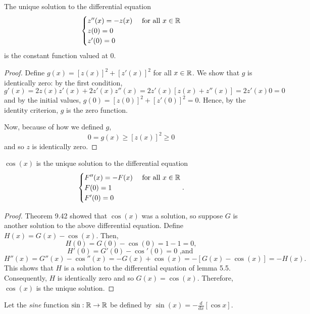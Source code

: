 \documentclass[letterpaper, twoside, 12pt]{book}
\begin{document}
\begin{lemma}[5.5]
  The unique solution to the differential equation
  \[
    \begin{cases}
      z''(x)=-z(x) & \text{ for all } x\in \mathbb R \\
      z(0)=0 \\
      z'(0)=0
    \end{cases}
  \]
  is the constant function valued at \(0\).
\end{lemma}

\begin{proof}
    Define \(g(x) = [z(x)]^2 + [z'(x)]^2\) for all \(x \in \mathbb R\).
    We show that \(g\) is identically zero: by the first condition, 
    \[ g'(x) = 2z(x)z'(x) + 2z'(x)z''(x) = 2z'(x)[z(x) + z''(x)] = 2z'(x)0 = 0 \]
    and by the initial values, \(g(0) = [z(0)]^2 + [z'(0)]^2 = 0 \).
    Hence, by the identity criterion, \(g\) is the zero function.

    Now, because of how we defined \(g\),
    \[ 0 = g(x) \geq [z(x)]^2 \geq 0 \]
    and so \(z\) is identically zero. 
\end{proof}


\begin{corollary}
  \(\cos(x)\) is the unique solution to the differential equation
  \[
    \begin{cases}
      F''(x)=-F(x) & \text{ for all } x\in \mathbb R \\
      F(0)=1 \\
      F'(0)=0
    \end{cases}
  .\]
\end{corollary}

\begin{proof}
    Theorem 9.42 showed that \(\cos(x)\) was a solution, so suppose
    \(G\) is another solution to the above differential equation. Define
    \(H(x) = G(x) - \cos(x)\). Then, \[H(0) = G(0) - \cos(0) = 1 - 1 = 0 , \]
    \[H'(0) = G'(0) - \cos'(0) = 0 \text{~,and~} \] 
    \[ H''(x) = G''(x) - \cos''(x) = -G(x) + \cos(x) = -[G(x) - \cos(x)] = -H(x) .\]
    This shows that \(H\) is a solution to the differential equation of lemma 5.5.
    Consequently, \(H\) is identically zero and so \(G(x) = \cos(x)\). 
    Therefore, \(\cos(x)\) is the unique solution.
\end{proof}

\begin{definition}
  Let the \textit{sine} function
  \(\sin:\mathbb R\to\mathbb R\) be defined by \(\sin(x)=-\frac{d}{dx}[\cos x]\).
\end{definition}
\end{document}
